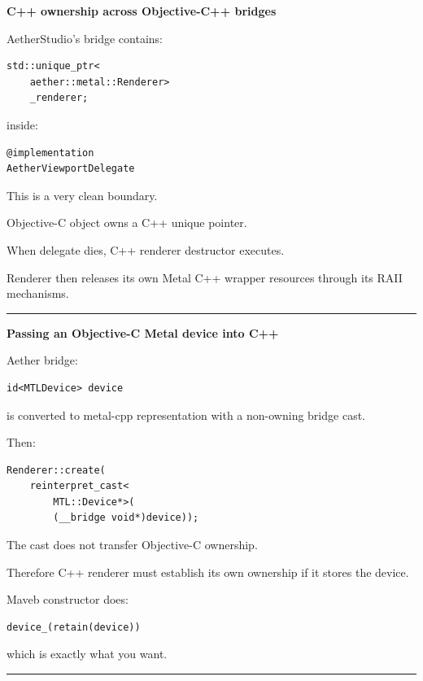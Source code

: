 \textbf{C++ ownership across Objective-C++ bridges}

AetherStudio's bridge contains:

\begin{verbatim}
std::unique_ptr<
    aether::metal::Renderer>
    _renderer;
\end{verbatim}

inside:

\begin{verbatim}
@implementation
AetherViewportDelegate
\end{verbatim}

This is a very clean boundary.

Objective-C object owns a C++ unique pointer.

When delegate dies, C++ renderer destructor executes.

Renderer then releases its own Metal C++ wrapper resources through its RAII mechanisms.

\begin{center}\rule{0.5\linewidth}{0.5pt}\end{center}

\textbf{Passing an Objective-C Metal device into C++}

Aether bridge:

\begin{verbatim}
id<MTLDevice> device
\end{verbatim}

is converted to metal-cpp representation with a non-owning bridge cast.

Then:

\begin{verbatim}
Renderer::create(
    reinterpret_cast<
        MTL::Device*>(
        (__bridge void*)device));
\end{verbatim}

The  cast does not transfer Objective-C ownership.

Therefore C++ renderer must establish its own ownership if it stores the device.

Maveb constructor does:

\begin{verbatim}
device_(retain(device))
\end{verbatim}

which is exactly what you want.

\begin{center}\rule{0.5\linewidth}{0.5pt}\end{center}

